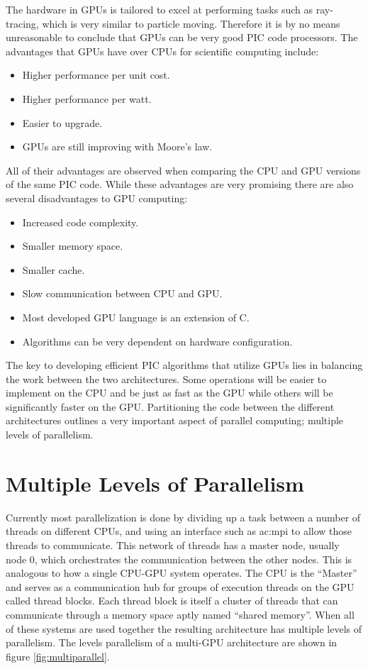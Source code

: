 The hardware in GPUs is tailored to excel at performing tasks such as ray-tracing, which is very similar to particle moving. Therefore it is by no means unreasonable to conclude that GPUs can be very good PIC code processors. The advantages that GPUs have over CPUs for scientific computing include:

\begin{itemize}
	\item Higher performance per unit cost.
	\item Higher performance per watt.
	\item Easier to upgrade.
	\item GPUs are still improving with Moore's law.
\end{itemize}

All of their advantages are observed when comparing the CPU and GPU versions of the same PIC code. While these advantages are very promising there are also several disadvantages to GPU computing:

\begin{itemize}
	\item Increased code complexity.
	\item Smaller memory space.
	\item Smaller cache.
	\item Slow communication between CPU and GPU.
	\item Most developed GPU language is an extension of C.
	\item Algorithms can be very dependent on hardware configuration.
\end{itemize}

The key to developing efficient PIC algorithms that utilize GPUs lies in balancing the work between the two architectures. Some operations will be easier to implement on the CPU and be just as fast as the GPU while others will be significantly faster on the GPU. Partitioning the code between the different architectures outlines a very important aspect of parallel computing; multiple levels of parallelism.

	\section{Multiple Levels of Parallelism}
	Currently most parallelization is done by dividing up a task between a number of threads on different CPUs, and using an interface such as \gls{ac:mpi} to allow those threads to communicate. This network of threads has a master node, usually node 0, which orchestrates the communication between the other nodes. This is analogous to how a single CPU-GPU system operates. The CPU is the ``Master'' and serves as a communication hub for groups of execution threads on the GPU called thread blocks. Each thread block is itself a cluster of threads that can communicate through a memory space aptly named ``shared memory''. When all of these systems are used together the resulting architecture has multiple levels of parallelism. The levels parallelism of a multi-GPU architecture are shown in figure \ref{fig:multiparallel}.

